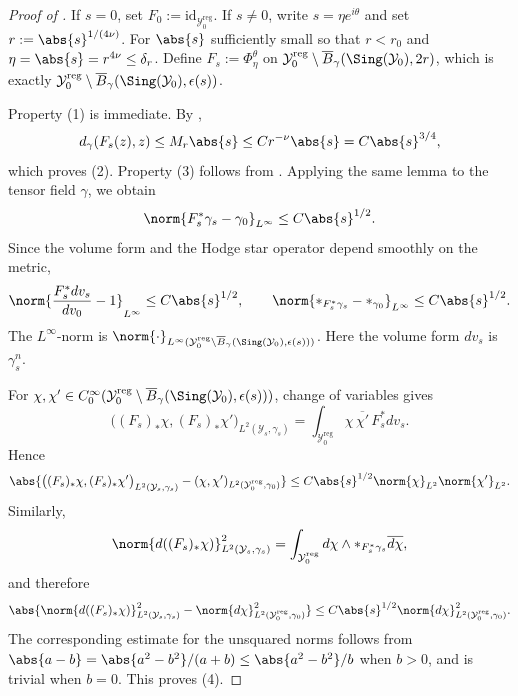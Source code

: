 \documentclass[12pt]{amsart}
\begin{document}
\begin{proof}[Proof of ]
If \(s=0\), set \(F_{0}:=\mathrm{id}_{\mathcal{Y}_{0}^{\mathrm{reg}}}\). If \(s\neq0\), write
\(s=\eta e^{i\theta}\) and set \(r:=\abs{s}^{1/(4\nu)}\). For \(\abs{s}\) sufficiently small so that $r < r_0$ and
\(\eta=\abs{s}=r^{4\nu}\leq\delta_{r}\). Define \(F_{s}:=\Phi_{\eta}^{\theta}\) on
\(\mathcal{Y}_{0}^{\mathrm{reg}}\setminus \overline{B}_{\gamma}(\Sing(\mathcal{Y}_{0}),2r)\), which is exactly
\(\mathcal{Y}_{0}^{\mathrm{reg}}\setminus \overline{B}_{\gamma}(\Sing(\mathcal{Y}_{0}),\epsilon(s))\).

Property (1) is immediate. By ,
\[
d_{\gamma}(F_{s}(z),z)\leq M_{r}\abs{s}\leq Cr^{-\nu}\abs{s}
=
C\abs{s}^{3/4},
\]
which proves (2). Property (3) follows from . Applying the same lemma to
the tensor field \(\gamma\), we obtain
\[
\norm{F_{s}^{*}\gamma_{s}-\gamma_{0}}_{L^{\infty}}\leq C\abs{s}^{1/2}.
\]
Since the volume form and the Hodge star operator depend smoothly on the metric,
\[
\norm{\frac{F_{s}^{*}dv_{s}}{dv_{0}}-1}_{L^{\infty}}\leq C\abs{s}^{1/2},
\qquad
\norm{*_{F_{s}^{*}\gamma_{s}}-*_{\gamma_{0}}}_{L^{\infty}}\leq C\abs{s}^{1/2}.
\]
The $L^{\infty}$-norm is $\norm{\cdot}_{L^\infty(\mathcal{Y}_{0}^{\mathrm{reg}}\setminus \overline{B}_{\gamma}(\Sing(\mathcal{Y}_{0}),\epsilon(s)))}$. Here the volume form $dv_{s}$ is $\gamma_s^n$.

For \(\chi,\chi'\in C_{0}^{\infty}(\mathcal{Y}_{0}^{\mathrm{reg}}\setminus
\overline{B}_{\gamma}(\Sing(\mathcal{Y}_{0}),\epsilon(s)))\), change of variables gives
\[
\bigl((F_{s})_{*}\chi,(F_{s})_{*}\chi'\bigr)_{L^{2}(\mathcal{Y}_{s},\gamma_{s})}
=
\int_{\mathcal{Y}_{0}^{\mathrm{reg}}}\chi\,\overline{\chi'}\,F_{s}^{*}dv_{s}.
\]
Hence
\[
\abs{
\bigl((F_{s})_{*}\chi,(F_{s})_{*}\chi'\bigr)_{L^{2}(\mathcal{Y}_{s},\gamma_{s})}
-
(\chi,\chi')_{L^{2}(\mathcal{Y}_{0}^{\mathrm{reg}},\gamma_{0})}
}
\leq
C\abs{s}^{1/2}\norm{\chi}_{L^{2}}\norm{\chi'}_{L^{2}}.
\]
Similarly,
\[
\norm{d((F_{s})_{*}\chi)}_{L^{2}(\mathcal{Y}_{s},\gamma_{s})}^{2}
=
\int_{\mathcal{Y}_{0}^{\mathrm{reg}}}d\chi\wedge *_{F_{s}^{*}\gamma_{s}}\overline{d\chi},
\]
and therefore
\[
\abs{
\norm{d((F_{s})_{*}\chi)}_{L^{2}(\mathcal{Y}_{s},\gamma_{s})}^{2}
-
\norm{d\chi}_{L^{2}(\mathcal{Y}_{0}^{\mathrm{reg}},\gamma_{0})}^{2}
}
\leq
C\abs{s}^{1/2}\norm{d\chi}_{L^{2}(\mathcal{Y}_{0}^{\mathrm{reg}},\gamma_{0})}^{2}.
\]
The corresponding estimate for the unsquared norms follows from
\(\abs{a-b}=\abs{a^{2}-b^{2}}/(a+b)\leq \abs{a^{2}-b^{2}}/b\) when \(b>0\), and is trivial when \(b=0\).
This proves (4).


\end{proof}
\end{document}

